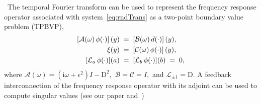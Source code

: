 \documentclass[%
secnumarabic,%
 amssymb, amsmath,%
 aps,prf,superscriptaddress,longbibliography
frontmatterverbose,
]{revtex4-2}
\begin{document}
	\vspace*{1ex}
~The temporal Fourier transform can be used to represent the frequency response operator associated with system~\eqref{eq:rndTrans} as a two-point boundary value problem (TPBVP),
\begin{align}
    \left[\mathcal A(\omega)\,\phi(\cdot)\right] (y) \;&=\; \left[\mathcal B(\omega)\, d(\cdot)\right](y),\notag\\
    \xi (y)\;&=\; \left[\mathcal C(\omega)\,\phi(\cdot)\right](y),\label{eq:mot1c}\\
    [\mathcal{L}_a \, \phi(\cdot)](a)  \;&=\; [\mathcal{L}_b \, \phi(\cdot)](b) \;=\;  0,\notag
  \end{align}  
where
	$
	\mathcal A (\omega) = (\mathrm i\omega + \epsilon^2) I - \mathrm D^2,
	$
	$
	\mathcal B 
	= 
	\mathcal C 
	= I,
	$
and 
	$
	\mathcal {L}_{\pm 1} = \mathrm D.
	$
A feedback interconnection of the frequency response operator with its adjoint can be used to compute singular values (see our paper and~\cite{Boyd1989})
\end{document}
